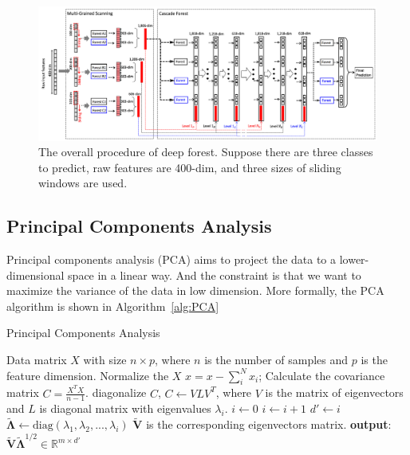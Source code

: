 \documentclass[sigconf]{acmart}
\begin{document}
	
	
\begin{figure}[h]
\centering
\includegraphics[width=0.9\linewidth]{../figs/deep-forest}
\caption{The overall procedure of deep forest. Suppose there are three classes to predict, raw features are 400-dim, and three sizes of sliding windows are used.}
\label{fig:deep-forest}
\end{figure}


\subsection{Principal Components Analysis}
Principal components analysis (PCA) \cite{dunteman1989principal} aims to project the data to a lower-dimensional space in a linear way. 
And the constraint is that we want to maximize the variance of the data in low dimension. More formally, the PCA algorithm is shown in Algorithm~\ref{alg:PCA} 

\begin{algorithm}[!htb]
	\caption{Principal Components Analysis}\label{alg:PCA}
	\begin{algorithmic}[1]
		\REQUIRE
		Data matrix $X$ with size $n\times p$, where $n$ is the number of samples and $p$ is the feature dimension.
		\STATE
		Normalize the $X$ $x=x-\sum_i^N x_i$;
		\STATE
		Calculate the covariance matrix $C=\frac{X^T X}{n-1}$.
		\STATE
		diagonalize $C$, $C\gets V L V^T$, where $V$ is the matrix of eigenvectors and $L$ is diagonal matrix with eigenvalues $\lambda_i$.
		\STATE
		$i \gets 0$
		\REPEAT
		\STATE
		$i \gets i+1$
		\STATE
		$d'\gets i$
		\STATE
		$\tilde{\mathbf{\Lambda}}\gets \text{diag}(\lambda_1,\lambda_2,...,\lambda_i)$
		\STATE
		$\tilde{\mathbf{V}}$ is the corresponding eigenvectors matrix.
		\STATE
		\textbf{output}:~~$\tilde{\mathbf{V}}\tilde{\mathbf{\Lambda}}^{1/2} \in \mathbb{R}^{m\times d'}$
	\end{algorithmic}
\end{algorithm}
\end{document}
